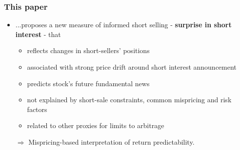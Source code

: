\documentclass{beamer}
\begin{document}
\begin{frame}
	\frametitle{This paper}
	\begin{itemize}
		\item ...proposes a new measure of informed short selling - \textbf{surprise in short interest} - that
		\begin{itemize}
			\item reflects changes in short-sellers' positions
			\item associated with strong price drift around short interest announcement
			\item predicts stock's future fundamental news
			\item not explained by short-sale constraints, common mispricing and risk factors	
			\item related to other proxies for limits to arbitrage
		\end{itemize} 
\item[$\Rightarrow$]   Mispricing-based interpretation of return predictability.
	\end{itemize}
\end{frame}
\end{document}
